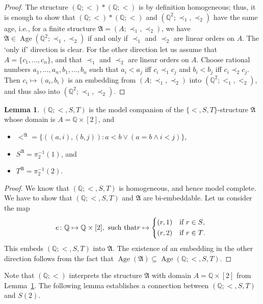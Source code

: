 \documentclass{amsart}
\theoremstyle{definition}
\newtheorem{lemma}[theorem]{Lemma}
\theoremstyle{remark}
\numberwithin{equation}{section}
\newcommand{\fa}{\mathfrak{A}}
\newcommand{\age}{\operatorname{Age}}
\begin{document}
\begin{proof}
	The structure $(\mathbb{Q};<)*(\mathbb{Q};<)$ is  by definition homogeneous; thus, it is enough to show that $(\mathbb{Q};<)*(\mathbb{Q};<)$ and $(\mathbb{Q}^2;\prec_1,\prec_2)$ have the same age, i.e., for a finite structure $\fa = (A;\prec_1,\prec_2)$, we have $\fa \in \age(\mathbb{Q}^2;\prec_1,\prec_2)$ if and only if $\prec_1$ and $\prec_2$ are linear orders on $A$. The `only if' direction is clear. For the other direction let us assume that $A=\{c_1,\dots,c_n\}$, and that $\prec_1$ and $\prec_2$ are linear orders on $A$. Choose rational numbers $a_1,\dots,a_n,b_1,\dots,b_n$ such that $a_i<a_j$ iff $c_i\prec_1c_j$ and $b_i<b_j$ iff $c_i\prec_2c_j$. Then $c_i\mapsto (a_i,b_i)$ is an embedding from $(A;\prec_1,\prec_2)$ into $(\mathbb{Q}^2;<_1,<_2)$, and thus also into $(\mathbb{Q}^2;\prec_1,\prec_2)$.
\end{proof}

\begin{lemma}\label{mc_core_part}
	$(\mathbb{Q};<,S,T)$ is the model companion of the $\{<,S,T\}$-structure $\fa$ whose domain is  $A=\mathbb{Q}\times [2]$, and
\begin{itemize}
\item $<^{\fa}=\{((a,i),(b,j)): a<b\vee (a=b\wedge i<j) \}$, 
\item $S^{\fa}=\pi_2^{-1}(1)$, and 
\item $T^{\fa}=\pi_2^{-1}(2)$.
\end{itemize}
\end{lemma}

\begin{proof}
	We know that $(\mathbb{Q};<,S,T)$ is homogeneous, and hence model complete. We have to show that $(\mathbb{Q};<,S,T)$ and $\fa$ are bi-embeddable. Let us consider the map \[e\colon \mathbb{Q}\mapsto \mathbb{Q}\times [2], \text{ such that} r\mapsto
\begin{cases*}
(r,1) & if $r\in S$,\\
(r,2) & if $r\in T$.
\end{cases*}
\]
	This embeds $(\mathbb{Q};<,S,T)$ into $\fa$. The existence of an embedding in the other direction follows from the fact that $\age(\fa)\subseteq \age(\mathbb{Q};<,S,T)$.
\end{proof}

	Note that $(\mathbb{Q};<)$ interprets the structure $\fa$ with domain $A = \mathbb{Q}\times [2]$ from Lemma~\ref{mc_core_part}.
The following lemma establishes a connection between $(\mathbb{Q};<,S,T)$ and $S(2)$.
	
\end{document}
